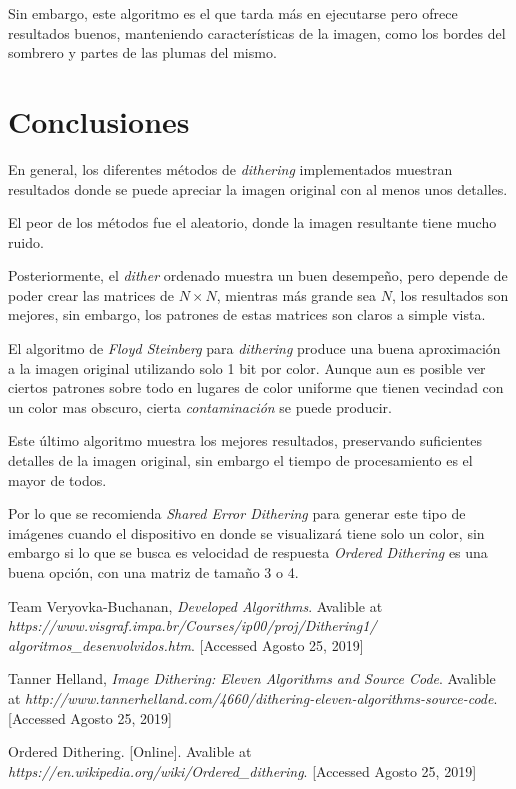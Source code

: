 \documentclass[conference]{IEEEtran}
\begin{document}
Sin embargo, este algoritmo es el que tarda más en ejecutarse pero ofrece resultados buenos, manteniendo características de la imagen, como los bordes del sombrero y partes de las plumas del mismo.

\section{Conclusiones}

En general, los diferentes métodos de \textit{dithering} implementados muestran resultados donde se puede apreciar la imagen original con al menos unos detalles.

El peor de los métodos fue el aleatorio, donde la imagen resultante tiene mucho ruido.

Posteriormente, el \textit{dither} ordenado muestra un buen desempeño, pero depende de poder crear las matrices de $N \times N$, mientras más grande sea $N$, los resultados son mejores, sin embargo, los patrones de estas matrices son claros a simple vista.

El algoritmo de \textit{Floyd Steinberg}  para \textit{dithering} produce una buena aproximación a la imagen original utilizando solo 1 bit por color. Aunque aun es posible ver ciertos patrones sobre todo en lugares de color uniforme que tienen vecindad con un color mas obscuro, cierta \textit{contaminación} se puede producir.

Este último algoritmo muestra los mejores resultados, preservando suficientes detalles de la imagen original, sin embargo el tiempo de procesamiento es el mayor de todos.

Por lo que se recomienda \textit{Shared Error Dithering} para generar este tipo de imágenes cuando el dispositivo en donde se visualizará tiene solo un color, sin embargo si lo que se busca es velocidad de respuesta \textit{Ordered Dithering} es una buena opción, con una matriz de tamaño 3 o 4.


\begin{thebibliography}{00}
 Team Veryovka-Buchanan, \textit{Developed Algorithms}. Avalible at \textit{https://www.visgraf.impa.br/Courses/ip00/proj/Dithering1/\\algoritmos\_desenvolvidos.htm}. [Accessed Agosto 25, 2019]

 Tanner Helland, \textit{Image Dithering: Eleven Algorithms and Source Code}. Avalible at \textit{http://www.tannerhelland.com/4660/dithering-eleven-algorithms-source-code}. [Accessed Agosto 25, 2019]

 Ordered Dithering. [Online]. Avalible at \textit{https://en.wikipedia.org/wiki/Ordered\_dithering}. [Accessed Agosto 25, 2019]
\end{thebibliography}
\end{document}
